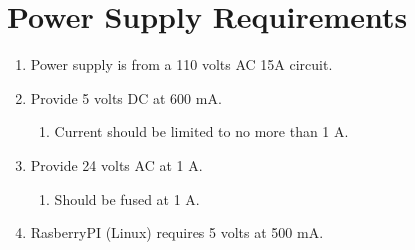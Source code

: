 \documentclass[12pt,letterpaper]{article}
\begin{document}
\section{Power Supply Requirements}

\begin{enumerate}
	\item Power supply is from a 110 volts AC 15A circuit.
	\item Provide 5 volts DC at 600 mA.
	\begin{enumerate}
		\item Current should be limited to no more than 1 A.
	\end{enumerate}
	\item Provide 24 volts AC at 1 A.
	\begin{enumerate}
		\item Should be fused at 1 A.
	\end{enumerate}
	\item RasberryPI (Linux) requires 5 volts at 500 mA.
\end{enumerate}


\pagebreak
\printbibliography[heading=bibintoc]
\end{document}
